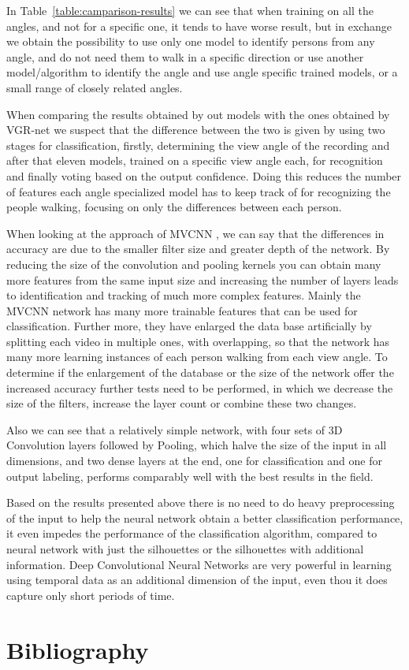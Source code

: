 \documentclass[12pt]{article}
\theoremstyle{definition}
\begin{document}
	In Table~\ref{table:camparison-results} we can see that when training on all the angles, and not for a specific one, it tends to have worse result, but in exchange we obtain the possibility to use only one model to identify persons from any angle, and do not need them to walk in a specific direction or use another model/algorithm to identify the angle and use angle specific trained models, or a small range of closely related angles.

	When comparing the results obtained by out models with the ones obtained by VGR-net \cite{VGR-Net} we suspect that the difference between the two is given by using two stages for classification, firstly, determining the view angle of the recording and after that eleven models, trained on a specific view angle each, for recognition and finally voting based on the output confidence. Doing this reduces the number of features each angle specialized model has to keep track of for recognizing the people walking, focusing on only the differences between each person.

	When looking at the approach of MVCNN \cite{Wolf2016MultiviewGR}, we can say that the differences in accuracy are due to the smaller filter size and greater depth of the network. By reducing the size of the convolution and pooling kernels you can obtain many more features from the same input size and increasing the number of layers leads to identification and tracking of much more complex features. Mainly the MVCNN network has many more trainable features that can be used for classification. Further more, they have enlarged the data base artificially by splitting each video in multiple ones, with overlapping, so that the network has many more learning instances of each person walking from each view angle. To determine if the enlargement of the database or the size of the network offer the increased accuracy further tests need to be performed, in which we decrease the size of the filters, increase the layer count or combine these two changes.

	Also we can see that a relatively simple network, with four sets of 3D Convolution layers followed by Pooling, which halve the size of the input in all dimensions, and two dense layers at the end, one for classification and one for output labeling, performs comparably well with the best results in the field.

	Based on the results presented above there is no need to do heavy preprocessing of the input to help the neural network obtain a better classification performance, it even impedes the performance of the classification algorithm, compared to neural network with just the silhouettes or the silhouettes with additional information. Deep Convolutional Neural Networks are very powerful in learning using temporal data as an additional dimension of the input, even thou it does capture only short periods of time.

	\clearpage

	\section{Bibliography}
	
	
\end{document}
